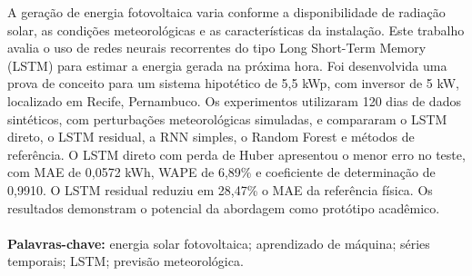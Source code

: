 \begin{resumo} 
A geração de energia fotovoltaica varia conforme a disponibilidade de radiação solar, as condições meteorológicas e as características da instalação. Este trabalho avalia o uso de redes neurais recorrentes do tipo Long Short-Term Memory (LSTM) para estimar a energia gerada na próxima hora. Foi desenvolvida uma prova de conceito para um sistema hipotético de 5,5 kWp, com inversor de 5 kW, localizado em Recife, Pernambuco. Os experimentos utilizaram 120 dias de dados sintéticos, com perturbações meteorológicas simuladas, e compararam o LSTM direto, o LSTM residual, a RNN simples, o Random Forest e métodos de referência. O LSTM direto com perda de Huber apresentou o menor erro no teste, com MAE de 0,0572 kWh, WAPE de 6,89\% e coeficiente de determinação de 0,9910. O LSTM residual reduziu em 28,47\% o MAE da referência física. Os resultados demonstram o potencial da abordagem como protótipo acadêmico.
\\\\
\noindent\textbf{Palavras-chave:} energia solar fotovoltaica; aprendizado de máquina; séries temporais; LSTM; previsão meteorológica.

\end{resumo}